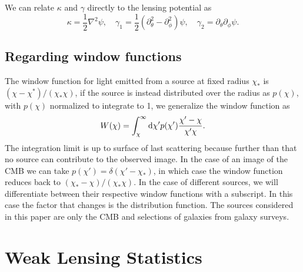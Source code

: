\documentclass[11pt]{article} %
\DeclareRobustCommand{\d}{\ifmmode\text{d}\else d\fi}
\begin{document}
We can relate $\kappa$ and $\gamma$ directly to the lensing potential as
\begin{equation}
    \kappa = \frac{1}{2}\nabla^2\psi, \quad \gamma_1 = \frac{1}{2}(\partial_\theta^2 - \partial_\phi^2)\psi, \quad \gamma_2 = \partial_\theta\partial_\phi \psi.
\end{equation}

\subsection{Regarding window functions}
The window function for light emitted from a source at fixed radius $\chi_*$ is $(\chi-\chi^*)/(\chi_*\chi)$, if the source is instead distributed over the radius as $p(\chi)$, with $p(\chi)$ normalized to integrate to 1, we generalize the window function as
\begin{equation*}
    W(\chi) = \int_\chi^{\infty}\d\chi' p(\chi')\frac{\chi'-\chi}{\chi'\chi}.
\end{equation*}
The integration limit is up to surface of last scattering because further than that no source can contribute to the observed image. In the case of an image of the CMB we can take $p(\chi')=\delta(\chi'-\chi_*)$, in which case the window function reduces back to $(\chi_*-\chi)/(\chi_*\chi)$. In the case of different sources, we will differentiate between their respective window functions with a subscript. In this case the factor that changes is the distribution function. The sources considered in this paper are only the CMB and selections of galaxies from galaxy surveys. 

\section{Weak Lensing Statistics}\label{sec:weaklensstats}
\end{document}
